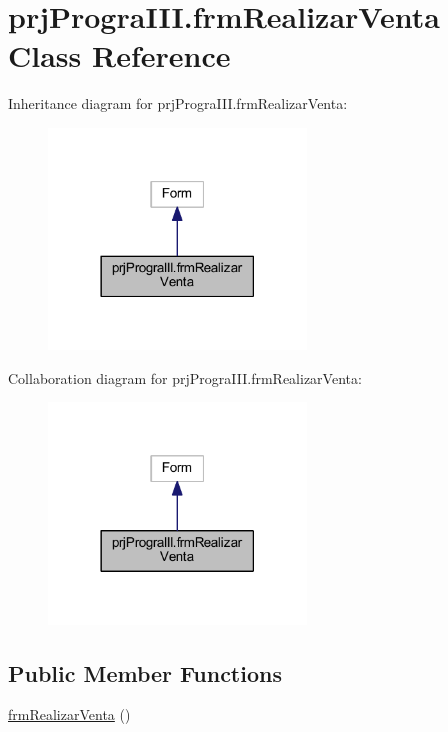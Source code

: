 \hypertarget{classprj_progra_i_i_i_1_1frm_realizar_venta}{}\section{prj\+Progra\+I\+I\+I.\+frm\+Realizar\+Venta Class Reference}
\label{classprj_progra_i_i_i_1_1frm_realizar_venta}


Inheritance diagram for prj\+Progra\+I\+I\+I.\+frm\+Realizar\+Venta\+:
\nopagebreak
\begin{figure}[H]
\begin{center}
\leavevmode
\includegraphics[width=194pt]{classprj_progra_i_i_i_1_1frm_realizar_venta__inherit__graph}
\end{center}
\end{figure}


Collaboration diagram for prj\+Progra\+I\+I\+I.\+frm\+Realizar\+Venta\+:
\nopagebreak
\begin{figure}[H]
\begin{center}
\leavevmode
\includegraphics[width=194pt]{classprj_progra_i_i_i_1_1frm_realizar_venta__coll__graph}
\end{center}
\end{figure}
\subsection*{Public Member Functions}
\begin{DoxyCompactItemize}
\item 
\hyperlink{classprj_progra_i_i_i_1_1frm_realizar_venta_ad5950906776440d5a1b3a57fe4eba5a0}{frm\+Realizar\+Venta} ()
\end{DoxyCompactItemize}
